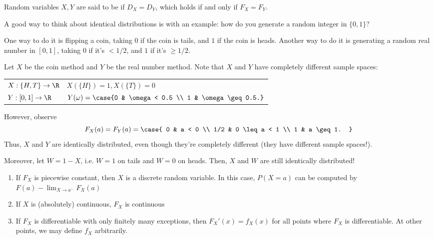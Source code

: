 \documentclass[11pt]{article}
\begin{document}
\begin{defn}
    Random variables $X,Y$ are said to be  if $D_X = D_Y$, which holds if and only if $F_X = F_Y$.
\end{defn}

A good way to think about identical distributions is with an example: how do you generate a random integer in $\{0,1\}$?

One way to do it is flipping a coin, taking $0$ if the coin is tails, and $1$ if the coin is heads. Another way to do it is generating a random real number in $[0,1]$, taking $0$ if it's $<1/2$, and $1$ if it's $\geq1/2$. 

Let $X$ be the coin method and $Y$ be the real number method. Note that $X$ and $Y$ have completely different sample spaces:
\begin{table}[h]
    \centering
    \begin{tabular}{ll}
        $X:\{H,T\} \to \R$ & $X(\{H\})=1, X(\{T\})=0$ \\
        $Y:[0,1]\to \R$ & $Y(\omega)=\case{0 & \omega < 0.5 \\ 1 & \omega \geq 0.5.}$
    \end{tabular}
\end{table}

However, observe
\[
F_X(a) =F_Y(a) = \case{ 0 & a < 0 \\ 1/2 & 0 \leq a < 1 \\ 1 & a \geq 1. }
\]
Thus, $X$ and $Y$ are identically distributed, even though they're completely different (they have different sample spaces!).

Moreover, let $W=1-X$, i.e. $W=1$ on tails and $W=0$ on heads. Then, $X$ and $W$ are still identically distributed!

\begin{rmk}
    \begin{enumerate}
        \item If $F_X$ is piecewise constant, then $X$ is a discrete random variable. In this case, $P(X=a)$ can be computed by $F(a) - \lim_{X \to a^{-}} F_X(a)$
        \item If $X$ is (absolutely) continuous, $F_X$ is continuous
        \item If $F_X$ is differentiable with only finitely many exceptions, then $F_X'(x)=f_X(x)$ for all points where $F_X$ is differentiable. At other points, we may define $f_X$ arbitrarily.
    \end{enumerate}
\end{rmk}
\end{document}

